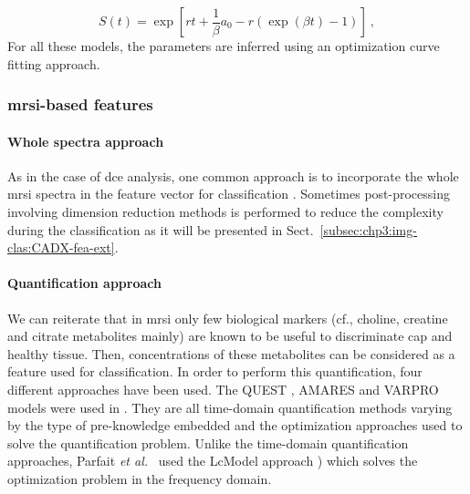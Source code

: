 
\begin{equation}
	S(t) = \exp \left[ r t + \frac{1}{\beta} a_0 - r \left( \exp( \beta t ) - 1 \right) \right] \ ,
	\label{eq:pun}
\end{equation}
\noindent For all these models, the parameters are inferred using an optimization curve fitting approach.


\subsubsection{\Ac{mrsi}-based features}\label{subsubsec:chp3:img-clas:CADX-fea-dec:MRSI-fea}

\paragraph{Whole spectra approach}
As in the case of \ac{dce} analysis, one common approach is to incorporate the whole \ac{mrsi} spectra in the feature vector for classification \cite{Kelm2007,Parfait2012,Tiwari2007,Tiwari2009,Tiwari2013,Tiwari2009a,Tiwari2010,Viswanath2008a,Matulewicz2013}. 
Sometimes post-processing involving dimension reduction methods is performed to reduce the complexity during the classification as it will be presented in Sect.~\ref{subsec:chp3:img-clas:CADX-fea-ext}.

\paragraph{Quantification approach}
We can reiterate that in \ac{mrsi} only few biological markers (cf., choline, creatine and citrate metabolites mainly) are known to be useful to discriminate \ac{cap} and healthy tissue.
Then, concentrations of these metabolites can be considered as a feature used for classification.
In order to perform this quantification, four different approaches have been used.
The QUEST \cite{Ratiney2005}, AMARES \cite{Vanhamme1997} and VARPRO \cite{Coleman1993} models were used in \cite{Kelm2007}.
They are all time-domain quantification methods varying by the type of pre-knowledge embedded and the optimization approaches used to solve the quantification problem.
Unlike the time-domain quantification approaches, Parfait \textit{et al.}~\cite{Parfait2012} used the LcModel approach \cite{Provencher1993}) which solves the optimization problem in the frequency domain.


